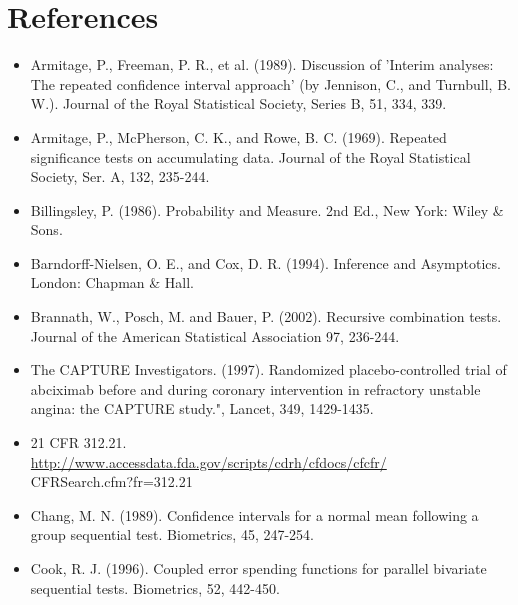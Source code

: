 \documentclass[10pt]{article}
\begin{document}
\section*{References}
\begin{itemize}
  \item[1.] Armitage, P., Freeman, P. R., et al. (1989). Discussion of 'Interim analyses: The repeated confidence interval approach' (by Jennison, C., and Turnbull, B. W.). Journal of the Royal Statistical Society, Series B, 51, 334, 339.
  \item[2.] Armitage, P., McPherson, C. K., and Rowe, B. C. (1969). Repeated significance tests on accumulating data. Journal of the Royal Statistical Society, Ser. A, 132, 235-244.
  \item[3.] Billingsley, P. (1986). Probability and Measure. 2nd Ed., New York: Wiley \& Sons.
  \item[4.] Barndorff-Nielsen, O. E., and Cox, D. R. (1994). Inference and Asymptotics. London: Chapman \& Hall.
  \item[5.] Brannath, W., Posch, M. and Bauer, P. (2002). Recursive combination tests. Journal of the American Statistical Association 97, 236-244.
  \item[6.] The CAPTURE Investigators. (1997). Randomized placebo-controlled trial of abciximab before and during coronary intervention in refractory unstable angina: the CAPTURE study.", Lancet, 349, 1429-1435.
  \item[7.] 21 CFR 312.21.\\
\href{http://www.accessdata.fda.gov/scripts/cdrh/cfdocs/cfcfr/}{http://www.accessdata.fda.gov/scripts/cdrh/cfdocs/cfcfr/}\\
CFRSearch.cfm?fr=312.21
  \item[8.] Chang, M. N. (1989). Confidence intervals for a normal mean following a group sequential test. Biometrics, 45, 247-254.
  \item[9.] Cook, R. J. (1996). Coupled error spending functions for parallel bivariate sequential tests. Biometrics, 52, 442-450.
\end{itemize}
\end{document}
